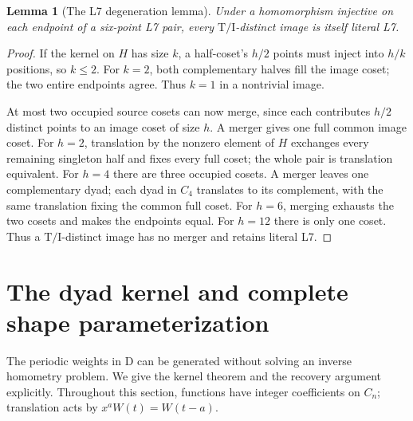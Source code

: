 \documentclass[11pt]{article}
\newtheorem{lemma}[theorem]{Lemma}
\theoremstyle{remark}
\newcommand{\TI}{\mathrm{T/I}}
\begin{document}
\begin{lemma}[The L7 degeneration lemma]\label{lem:l7}
Under a homomorphism injective on each endpoint of a six-point L7 pair,
every $\TI$-distinct image is itself literal L7.
\end{lemma}
\begin{proof}
If the kernel on $H$ has size $k$, a half-coset's $h/2$ points must
inject into $h/k$ positions, so $k\le2$. For $k=2$, both complementary
halves fill the image coset; the two entire endpoints agree. Thus $k=1$
in a nontrivial image.

At most two occupied source cosets can now merge, since each contributes
$h/2$ distinct points to an image coset of size $h$. A merger gives one
full common image coset. For $h=2$, translation by the nonzero element
of $H$ exchanges every remaining singleton half and fixes every full
coset; the whole pair is translation equivalent. For $h=4$ there are
three occupied cosets. A merger leaves one complementary dyad; each
dyad in $C_4$ translates to its complement, with the same translation
fixing the common full coset. For $h=6$, merging exhausts the two cosets
and makes the endpoints equal. For $h=12$ there is only one coset.
Thus a $\TI$-distinct image has no merger and retains literal L7.
\end{proof}

\section{The dyad kernel and complete shape parameterization}\label{sec:dyadfull}

The periodic weights in D can be generated without solving an inverse
homometry problem. We give the kernel theorem and the recovery argument
explicitly. Throughout this section, functions have integer coefficients
on $C_n$; translation acts by $x^aW(t)=W(t-a)$.
\end{document}
